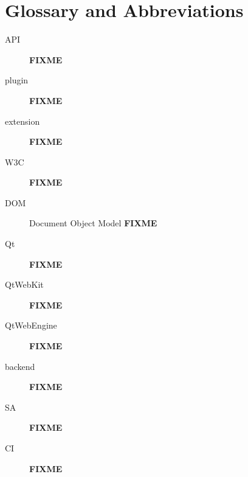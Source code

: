 \documentclass[a4paper,parskip=full]{scrreprt}
\newcommand{\fixme}[1]{\textbf{FIXME} \emph{#1}}
\begin{document}
\chapter{Glossary and Abbreviations}
\begin{description}
  \item[API]{\fixme{}}
  \item[plugin]{\fixme{}}
  \item[extension]{\fixme{}}
  \item[W3C]{\fixme{}}
  \item[DOM]{Document Object Model \fixme{}}
  \item[Qt]{\fixme{}}
  \item[QtWebKit]{\fixme{}}
  \item[QtWebEngine]{\fixme{}}
  \item[backend]{\fixme{}}
  \item[SA]{\fixme{}}
  \item[CI]{\fixme{}}
\end{description}

\nocite{yapproach}
\renewcommand{\bibname}{\chapter{Literature and Sources}}


\end{document}
